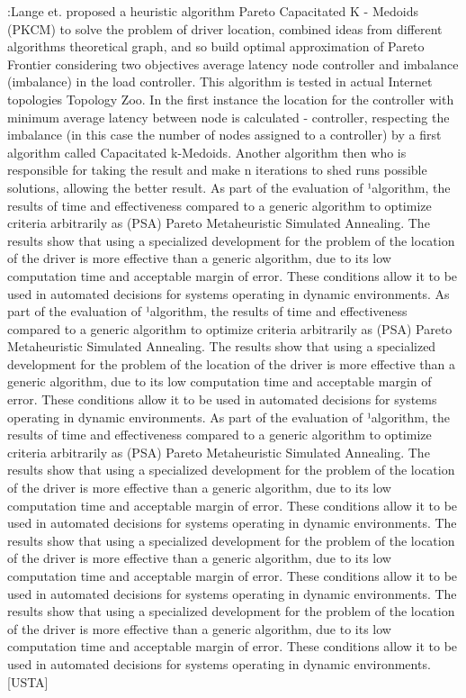 \documentclass[a4paper,10pt]{article}
\begin{document}
\cite{LaGeb15}:Lange et.  proposed a heuristic algorithm Pareto Capacitated K - Medoids (PKCM) to solve the problem of driver location, combined ideas from different algorithms theoretical graph, and so build optimal approximation of Pareto Frontier considering two objectives average latency node controller and imbalance (imbalance) in the load controller. This algorithm is tested in actual Internet topologies Topology Zoo. In the first instance the location for the controller with minimum average latency between node is calculated - controller, respecting the imbalance (in this case the number of nodes assigned to a controller) by a first algorithm called Capacitated k-Medoids. Another algorithm then who is responsible for taking the result and make n iterations to shed runs possible solutions, allowing the better result. As part of the evaluation of ¹algorithm, the results of time and effectiveness compared to a generic algorithm to optimize criteria arbitrarily as (PSA) Pareto Metaheuristic Simulated Annealing. The results show that using a specialized development for the problem of the location of the driver is more effective than a generic algorithm, due to its low computation time and acceptable margin of error. These conditions allow it to be used in automated decisions for systems operating in dynamic environments. As part of the evaluation of ¹algorithm, the results of time and effectiveness compared to a generic algorithm to optimize criteria arbitrarily as (PSA) Pareto Metaheuristic Simulated Annealing. The results show that using a specialized development for the problem of the location of the driver is more effective than a generic algorithm, due to its low computation time and acceptable margin of error. These conditions allow it to be used in automated decisions for systems operating in dynamic environments. As part of the evaluation of ¹algorithm, the results of time and effectiveness compared to a generic algorithm to optimize criteria arbitrarily as (PSA) Pareto Metaheuristic Simulated Annealing. The results show that using a specialized development for the problem of the location of the driver is more effective than a generic algorithm, due to its low computation time and acceptable margin of error. These conditions allow it to be used in automated decisions for systems operating in dynamic environments. The results show that using a specialized development for the problem of the location of the driver is more effective than a generic algorithm, due to its low computation time and acceptable margin of error. These conditions allow it to be used in automated decisions for systems operating in dynamic environments. The results show that using a specialized development for the problem of the location of the driver is more effective than a generic algorithm, due to its low computation time and acceptable margin of error. These conditions allow it to be used in automated decisions for systems operating in dynamic environments.[USTA]
\end{document}
